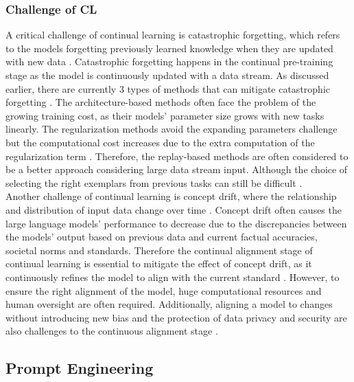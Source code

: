 \documentclass[runningheads]{llncs}
\begin{document}
\subsubsection{Challenge of CL}
\noindent \newline
A critical challenge of continual learning is catastrophic forgetting, which refers to the models forgetting previously learned knowledge 
when they are updated with new data \cite{Gupta23}. Catastrophic forgetting happens in the continual pre-training stage as the model is continuously updated with a data stream.
As discussed earlier, there are currently 3 types of methods that can mitigate catastrophic forgetting \cite{Shi24}. The architecture-based methods often face the problem of the growing 
training cost, as their models' parameter size grows with new tasks linearly\cite{Jovanov}. The regularization methods avoid the expanding parameters challenge but the computational cost
increases due to the extra computation of the regularization term \cite{Wang24}. Therefore, the replay-based methods are often considered to be
a better approach considering large data stream input. Although the choice of selecting the right exemplars from previous tasks can still be difficult \cite{Jovanov}. \\
\noindent \newline
Another challenge of continual learning is concept drift, where the relationship and distribution of input data change over time \cite{Biesi20}. Concept drift often causes the large language models' performance to decrease
due to the discrepancies between the models' output based on previous data and current factual accuracies, societal norms and standards. Therefore the continual alignment stage of continual learning is essential to 
mitigate the effect of concept drift, as it continuously refines the model to align with the current standard \cite{Taori23}.
However, to ensure the right alignment of the model, huge computational resources and human oversight are often required. Additionally, aligning a model to changes without introducing new bias and the protection of data
privacy and security are also challenges to the continuous alignment stage \cite{Shi24}. 

\subsection{Prompt Engineering}
\end{document}
